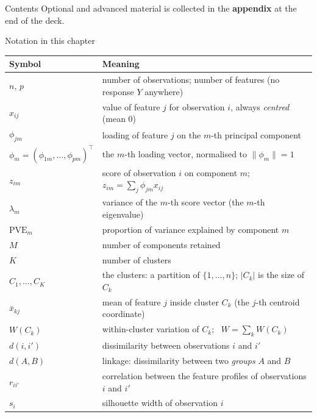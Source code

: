 \documentclass[aspectratio=169,11pt]{beamer}
\begin{document}
\begin{frame}{Contents}\small\tableofcontents[hideallsubsections]
  \vfill
  {\tiny Optional and advanced material is collected in the \textbf{appendix} at the end of the deck.}
\end{frame}

\begin{frame}{Notation in this chapter}
  \footnotesize
  \begin{center}
  \begin{tabular}{@{}ll@{}}
    \toprule
    \textbf{Symbol} & \textbf{Meaning} \\
    \midrule
    $n$, $p$ & number of observations; number of features (no response $Y$ anywhere) \\
    $x_{ij}$ & value of feature $j$ for observation $i$, always \emph{centred} (mean $0$) \\
    $\phi_{jm}$ & loading of feature $j$ on the $m$-th principal component \\
    $\phi_m=(\phi_{1m},\dots,\phi_{pm})^\top$ & the $m$-th loading vector, normalised to $\|\phi_m\|=1$ \\
    $z_{im}$ & score of observation $i$ on component $m$; $z_{im}=\sum_j \phi_{jm}x_{ij}$ \\
    $\lambda_m$ & variance of the $m$-th score vector (the $m$-th eigenvalue) \\
    $\mathrm{PVE}_m$ & proportion of variance explained by component $m$ \\
    $M$ & number of components retained \\
    $K$ & number of clusters \\
    $C_1,\dots,C_K$ & the clusters: a partition of $\{1,\dots,n\}$; $|C_k|$ is the size of $C_k$ \\
    $\bar x_{kj}$ & mean of feature $j$ inside cluster $C_k$ (the $j$-th centroid coordinate) \\
    $W(C_k)$ & within-cluster variation of $C_k$; \ $W=\sum_k W(C_k)$ \\
    $d(i,i')$ & dissimilarity between observations $i$ and $i'$ \\
    $d(A,B)$ & linkage: dissimilarity between two \emph{groups} $A$ and $B$ \\
    $r_{ii'}$ & correlation between the feature profiles of observations $i$ and $i'$ \\
    $s_i$ & silhouette width of observation $i$ \\
    \bottomrule
  \end{tabular}
  \end{center}
\end{frame}
\end{document}
